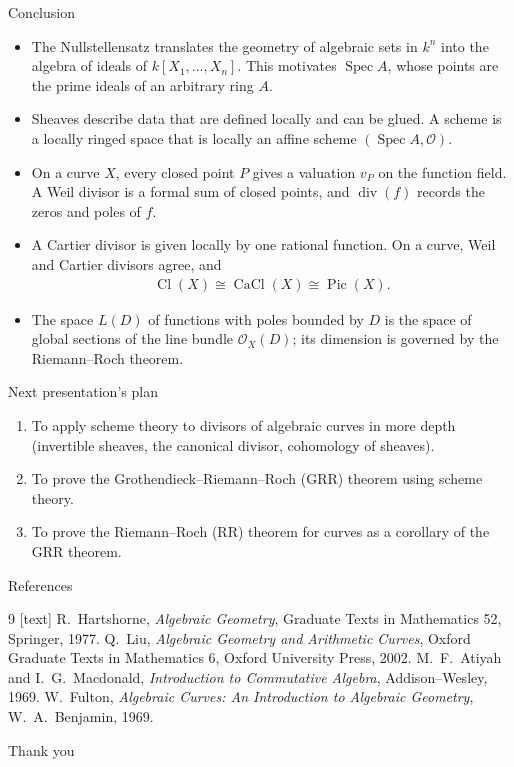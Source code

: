 \documentclass[10pt,aspectratio=1610]{beamer}
\DeclareMathOperator{\Spec}{Spec}
\DeclareMathOperator{\Cl}{Cl}
\DeclareMathOperator{\CaCl}{CaCl}
\DeclareMathOperator{\Pic}{Pic}
\DeclareMathOperator{\divv}{div}
\newcommand{\OO}{\mathcal{O}}
\begin{document}
    \begin{frame}{Conclusion}
        \begin{itemize}
            \item The Nullstellensatz translates the geometry of algebraic sets in $k^n$ into the algebra of ideals of $k[X_1, \ldots, X_n]$. This motivates $\Spec A$, whose points are the prime ideals of an arbitrary ring $A$.
            \item Sheaves describe data that are defined locally and can be glued. A scheme is a locally ringed space that is locally an affine scheme $(\Spec A, \OO)$.
            \item On a curve $X$, every closed point $P$ gives a valuation $v_P$ on the function field. A Weil divisor is a formal sum of closed points, and $\divv(f)$ records the zeros and poles of $f$.
            \item A Cartier divisor is given locally by one rational function. On a curve, Weil and Cartier divisors agree, and
            \begin{align*}
                \Cl(X) \cong \CaCl(X) \cong \Pic(X).
            \end{align*}
            \item The space $L(D)$ of functions with poles bounded by $D$ is the space of global sections of the line bundle $\OO_X(D)$; its dimension is governed by the Riemann--Roch theorem.
        \end{itemize}
    \end{frame}

    \begin{frame}{Next presentation's plan}
        \begin{enumerate}
            \item To apply scheme theory to divisors of algebraic curves in more depth (invertible sheaves, the canonical divisor, cohomology of sheaves).
            \item To prove the Grothendieck--Riemann--Roch (GRR) theorem using scheme theory.
            \item To prove the Riemann--Roch (RR) theorem for curves as a corollary of the GRR theorem.
        \end{enumerate}
    \end{frame}

    \begin{frame}{References}
        \begin{thebibliography}{9}
            [text]
             R.~Hartshorne, \emph{Algebraic Geometry}, Graduate Texts in Mathematics 52, Springer, 1977.
             Q.~Liu, \emph{Algebraic Geometry and Arithmetic Curves}, Oxford Graduate Texts in Mathematics 6, Oxford University Press, 2002.
             M.~F.~Atiyah and I.~G.~Macdonald, \emph{Introduction to Commutative Algebra}, Addison--Wesley, 1969.
             W.~Fulton, \emph{Algebraic Curves: An Introduction to Algebraic Geometry}, W.~A.~Benjamin, 1969.
        \end{thebibliography}
    \end{frame}

    \begin{frame}
        \centering
        {\Large Thank you}
    \end{frame}
\end{document}
